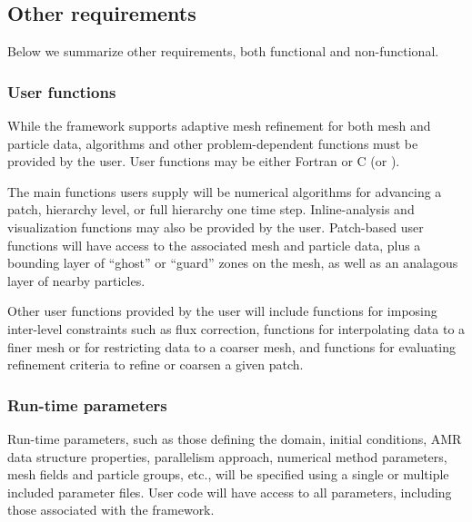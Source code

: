 \documentclass[10pt,twocolumn]{article}
\begin{document}
\subsection{Other requirements} \label{ss:require-other}

Below we summarize other requirements, both functional and
non-functional.
  
\subsubsection{User functions} \label{sss:require-user}

While the framework supports adaptive mesh refinement for both mesh
and particle data, algorithms and other problem-dependent functions
must be provided by the user.  User functions may be either Fortran or
C (or \cpp).  

The main functions users supply will be numerical algorithms for
advancing a patch, hierarchy level, or full hierarchy one time step.
Inline-analysis and visualization functions may also be provided by
the user.  Patch-based user functions will have access to the
associated mesh and particle data, plus a bounding layer of ``ghost''
or ``guard'' zones on the mesh, as well as an analagous layer of
nearby particles.

Other user functions provided by the user will include functions for
imposing inter-level constraints such as flux correction, functions
for interpolating data to a finer mesh or for restricting data to a
coarser mesh, and functions for evaluating refinement criteria to
refine or coarsen a given patch.



\subsubsection{Run-time parameters} \label{sss:require-parameters}

Run-time parameters, such as those defining the domain, initial
conditions, AMR data structure properties, parallelism approach,
numerical method parameters, mesh fields and particle groups, etc.,
will be specified using a single or multiple included parameter files.
User code will have access to all parameters, including those
associated with the framework.
\end{document}
